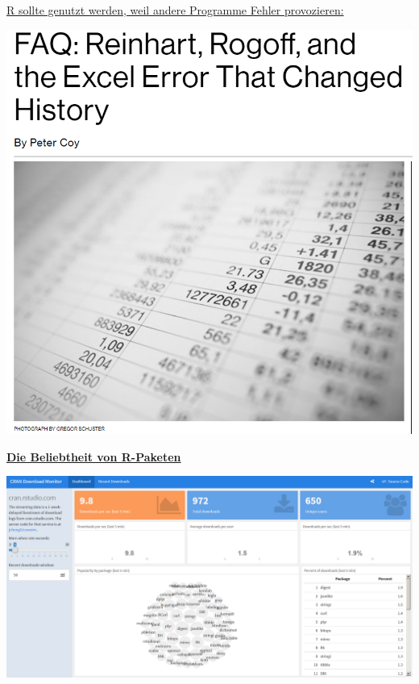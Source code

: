 \documentclass[ignorenonframetext,]{beamer}
\begin{document}
\begin{frame}{\href{https://www.bloomberg.com/news/articles/2013-04-18/faq-reinhart-rogoff-and-the-excel-error-that-changed-history}{R
sollte genutzt werden, weil andere Programme Fehler provozieren:}}

\includegraphics{figure/RheinhartRogoff.PNG}

\end{frame}

\begin{frame}{\href{https://gallery.shinyapps.io/cran-gauge/}{\textbf{Die
Beliebtheit von R-Paketen}}}

\includegraphics{figure/CRANdownloads.PNG}

\end{frame}
\end{document}
